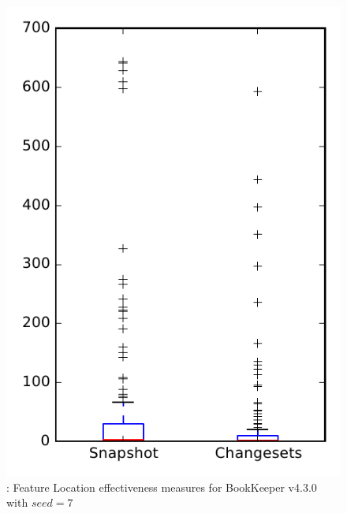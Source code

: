 
\begin{figure}
\centering
\includegraphics[height=0.4\textheight]{figures/flt_seed/rq1_bookkeeper_7}
\caption{\rone: Feature Location effectiveness measures for BookKeeper v4.3.0 with $seed=7$}
\label{fig:flt_seed:rq1:bookkeeper}
\end{figure}
